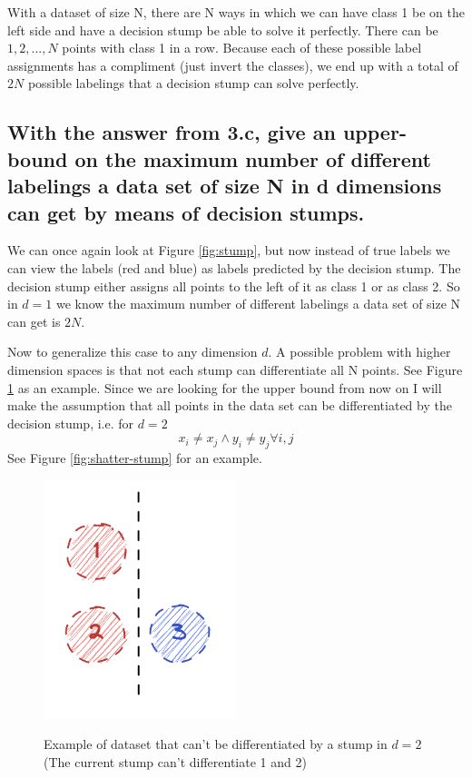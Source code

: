 \documentclass[11pt,a4paper]{article}
\begin{document}
With a dataset of size N, there are N ways in which we can have class 1 be on the left side and have a decision stump be able to solve it perfectly. There can be $1, 2, ..., N$ points with class 1 in a row.
Because each of these possible label assignments has a compliment (just invert the classes), we end up with a total of $2N$ possible labelings that a decision stump can solve perfectly.

\subsection{With the answer from 3.c, give an upper-bound on the maximum number of different
labelings a data set of size N in d dimensions can get by means of decision stumps.}
\label{sec:2d}

We can once again look at Figure \ref*{fig:stump}, but now instead of true labels we can view the labels (red and blue) as labels predicted by the decision stump. The decision stump either assigns all points to the left of it as class 1 or as class 2. So in $d=1$ we know the maximum number of different labelings a data set of size N can get is $2N$. 

Now to generalize this case to any dimension $d$. A possible problem with higher dimension spaces is that not each stump can differentiate all N points. See Figure \ref{fig:non-shatter-stump} as an example. Since we are looking for the upper bound from now on I will make the assumption that all points in the data set can be differentiated by the decision stump, i.e. for $d=2$
$$x_i \neq x_j \land y_i \neq y_j \forall i,j$$
See Figure \ref{fig:shatter-stump} for an example.

\begin{figure}[h]
    \caption{Example of dataset that can't be differentiated by a stump in $d=2$ (The current stump can't differentiate 1 and 2)}
    \centering
    \includegraphics[width=0.5\textwidth]{non-shatter-stump.png}
    \label{fig:non-shatter-stump}
\end{figure}
\end{document}
